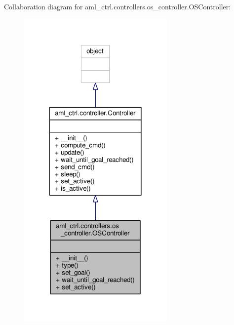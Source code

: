 Collaboration diagram for aml\-\_\-ctrl.\-controllers.\-os\-\_\-controller.\-O\-S\-Controller\-:
\nopagebreak
\begin{figure}[H]
\begin{center}
\leavevmode
\includegraphics[width=218pt]{classaml__ctrl_1_1controllers_1_1os__controller_1_1_o_s_controller__coll__graph}
\end{center}
\end{figure}
